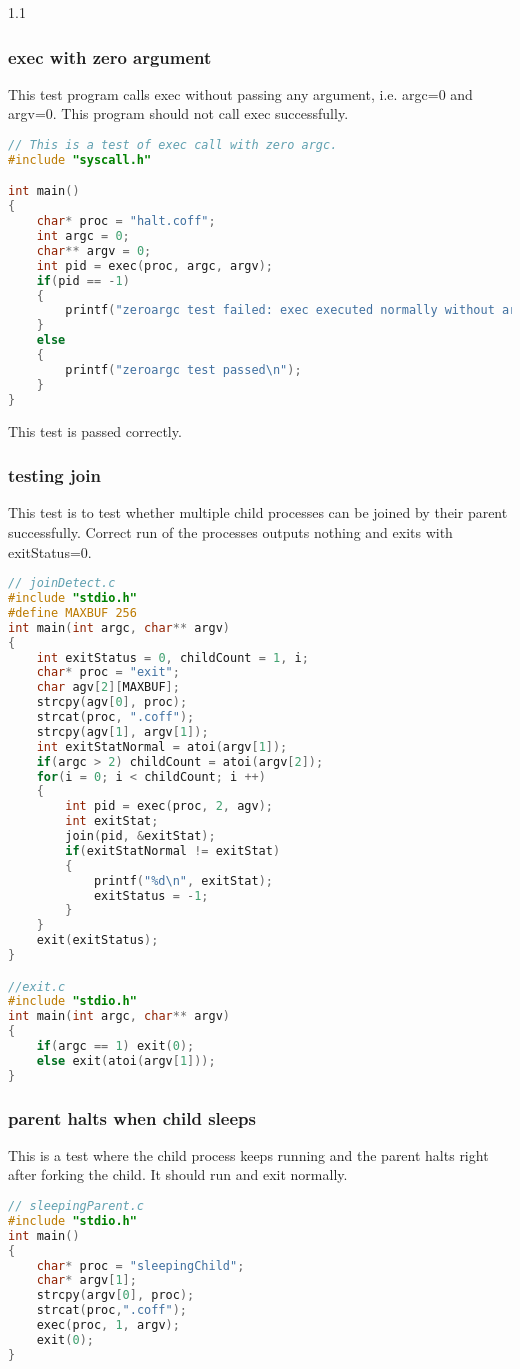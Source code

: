 \documentclass{article}
\begin{document}
\begin{spacing}{1.1}
\subsubsection{\textsf{exec} with zero argument}
This test program calls \textsf{exec} without passing any argument, i.e. \textsf{argc}=0 and \textsf{argv}=0. This program should not call \textsf{exec} successfully.
\begin{lstlisting}[language=C]
// This is a test of exec call with zero argc.
#include "syscall.h"

int main()
{
    char* proc = "halt.coff";
    int argc = 0;
    char** argv = 0;
    int pid = exec(proc, argc, argv);
    if(pid == -1)
    {
        printf("zeroargc test failed: exec executed normally without argc\n");
    }
    else
    {
        printf("zeroargc test passed\n");
    }
}
\end{lstlisting}
This test is passed correctly.
\subsubsection{testing \textsf{join}}
This test is to test whether multiple child processes can be joined by their parent successfully. Correct run of the processes outputs nothing and exits with \textsf{exitStatus}=0.
\begin{lstlisting}[language=C]
// joinDetect.c
#include "stdio.h"
#define MAXBUF 256
int main(int argc, char** argv)
{
    int exitStatus = 0, childCount = 1, i;
    char* proc = "exit";
    char agv[2][MAXBUF];
    strcpy(agv[0], proc);
    strcat(proc, ".coff");
    strcpy(agv[1], argv[1]);
    int exitStatNormal = atoi(argv[1]);
    if(argc > 2) childCount = atoi(argv[2]);
    for(i = 0; i < childCount; i ++)
    {
        int pid = exec(proc, 2, agv);
        int exitStat;
        join(pid, &exitStat);
        if(exitStatNormal != exitStat)
        {
            printf("%d\n", exitStat);
            exitStatus = -1;
        }
    }
    exit(exitStatus);
}

//exit.c
#include "stdio.h"
int main(int argc, char** argv)
{
    if(argc == 1) exit(0);
    else exit(atoi(argv[1]));
}
\end{lstlisting}

\subsubsection{parent halts when child sleeps}
This is a test where the child process keeps running and the parent halts right after forking the child. It should run and exit normally.
\begin{lstlisting}[language=C]
// sleepingParent.c
#include "stdio.h"
int main()
{
    char* proc = "sleepingChild";
    char* argv[1];
    strcpy(argv[0], proc);
    strcat(proc,".coff");
    exec(proc, 1, argv);
    exit(0);
}


\end{lstlisting}
\end{spacing}
\end{document}
